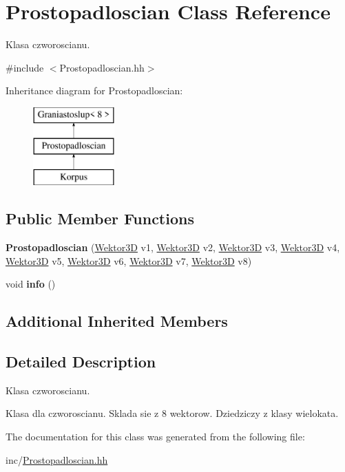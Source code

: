 \hypertarget{class_prostopadloscian}{}\section{Prostopadloscian Class Reference}
\label{class_prostopadloscian}


Klasa czworoscianu.  




{\ttfamily \#include $<$Prostopadloscian.\+hh$>$}

Inheritance diagram for Prostopadloscian\+:\begin{figure}[H]
\begin{center}
\leavevmode
\includegraphics[height=3.000000cm]{class_prostopadloscian}
\end{center}
\end{figure}
\subsection*{Public Member Functions}
\begin{DoxyCompactItemize}
\item 
\mbox{\label{class_prostopadloscian_af2fd7b8eaf7bbfed83bda9935231a0a3}} 
{\bfseries Prostopadloscian} (\mbox{\hyperlink{class_wektor}{Wektor3D}} v1, \mbox{\hyperlink{class_wektor}{Wektor3D}} v2, \mbox{\hyperlink{class_wektor}{Wektor3D}} v3, \mbox{\hyperlink{class_wektor}{Wektor3D}} v4, \mbox{\hyperlink{class_wektor}{Wektor3D}} v5, \mbox{\hyperlink{class_wektor}{Wektor3D}} v6, \mbox{\hyperlink{class_wektor}{Wektor3D}} v7, \mbox{\hyperlink{class_wektor}{Wektor3D}} v8)
\item 
\mbox{\label{class_prostopadloscian_a8995d937cb421474df0c70992cf48d3a}} 
void {\bfseries info} ()
\end{DoxyCompactItemize}
\subsection*{Additional Inherited Members}


\subsection{Detailed Description}
Klasa czworoscianu. 

Klasa dla czworoscianu. Sklada sie z 8 wektorow. Dziedziczy z klasy wielokata. 

The documentation for this class was generated from the following file\+:\begin{DoxyCompactItemize}
\item 
inc/\mbox{\hyperlink{_prostopadloscian_8hh}{Prostopadloscian.\+hh}}\end{DoxyCompactItemize}
